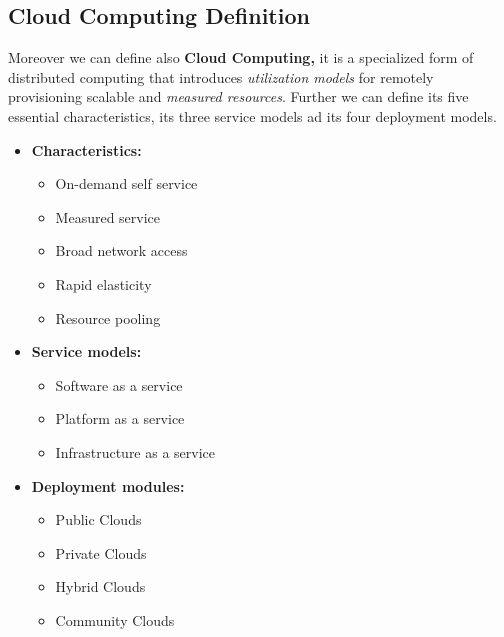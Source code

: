 \subsection{Cloud Computing Definition}
Moreover we can define also \textbf{Cloud Computing,} it is a specialized form of distributed computing that introduces \textit{utilization models} for remotely provisioning scalable and \textit{measured resources}. Further we can define its five essential characteristics, its three service models ad its four deployment models.
\begin{itemize}
    \item \textbf{Characteristics:}
    \begin{itemize}
        \item On-demand self service
        \item Measured service
        \item Broad network access
        \item Rapid elasticity
        \item Resource pooling
    \end{itemize}
    \item \textbf{Service models:}
    \begin{itemize}
        \item Software as a service
        \item Platform as a service
        \item Infrastructure as a service
    \end{itemize}
    \item \textbf{Deployment modules:}
    \begin{itemize}
        \item Public Clouds
        \item Private Clouds
        \item Hybrid Clouds
        \item Community Clouds
    \end{itemize}
\end{itemize}

